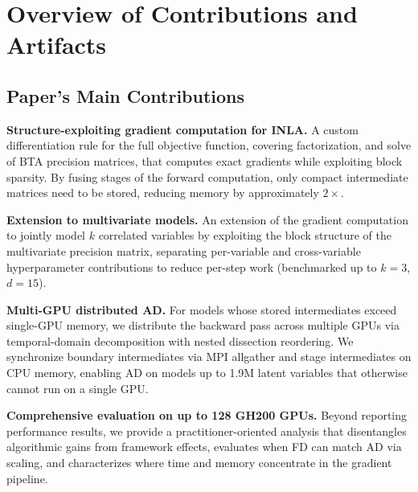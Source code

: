 \documentclass[nonacm,sigconf]{acmart}
\begin{document}
\pagestyle{empty}


\appendixAD

\section{Overview of Contributions and Artifacts}

\subsection{Paper's Main Contributions}

\begin{description}[leftmargin=1.8em,labelindent=0pt,itemsep=3pt,topsep=3pt]
\item[$C_1$] \textbf{Structure-exploiting gradient computation for INLA.}
A custom differentiation rule for the full objective function,
covering factorization, and solve of BTA
precision matrices, that computes exact gradients while exploiting
block sparsity. By fusing stages of the forward computation, only
compact intermediate matrices need to be stored, reducing memory
by approximately $2\times$.
\item[$C_2$] \textbf{Extension to multivariate models.}
An extension of the gradient computation to jointly model $k$
correlated variables by exploiting the block structure of the
multivariate precision matrix, separating per-variable and
cross-variable hyperparameter contributions to reduce per-step
work (benchmarked up to $k{=}3$, $d{=}15$).
\item[$C_3$] \textbf{Multi-GPU distributed AD.}
For models whose stored intermediates exceed single-GPU memory,
we distribute the backward pass across multiple GPUs via
temporal-domain decomposition with nested dissection reordering.
We synchronize boundary intermediates via MPI allgather and stage
intermediates on CPU memory, enabling AD on models up to
1.9M latent variables that otherwise cannot run on a single GPU.
\item[$C_4$] \textbf{Comprehensive evaluation on up to 128 GH200 GPUs.}
Beyond reporting performance results, we provide a
practitioner-oriented analysis that disentangles algorithmic
gains from framework effects, evaluates when FD can match AD
via scaling, and characterizes where time and memory concentrate
in the gradient pipeline.
\end{description}
\end{document}
